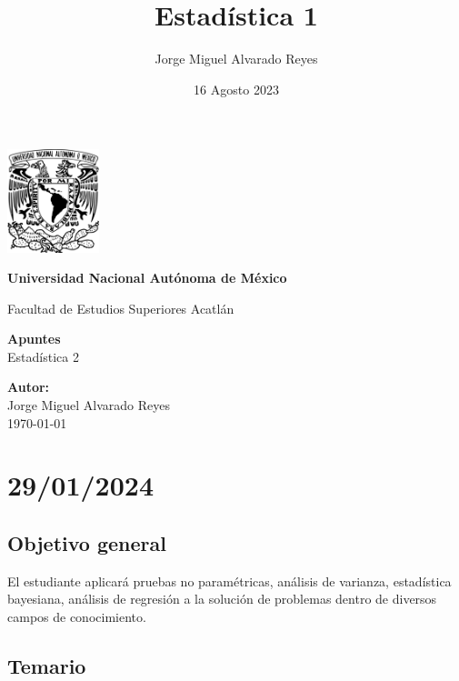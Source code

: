 \documentclass{article}
\title{Estadística 1}
\author{Jorge Miguel Alvarado Reyes}
\date{16 Agosto 2023}
\begin{document}
\begin{titlepage}
    \begin{center}
        \includegraphics[width=0.2\textwidth]{../unam.png}
        \vspace*{.5cm}

        \LARGE
        \textbf{Universidad Nacional Autónoma de México}

        \vspace{0.5cm}
        \LARGE
        Facultad de Estudios Superiores Acatlán

        \vspace{2cm}

        \textbf{Apuntes} \\
        Estadística 2

        \vfill

        \vspace{1cm}

        \textbf{\large Autor:} \\
        Jorge Miguel Alvarado Reyes \\
        \vspace{.5cm}
        \normalsize \today

    \end{center}
\end{titlepage}
\newpage

\tableofcontents

\newpage

\section{29/01/2024}

\subsection{Objetivo general}

El estudiante aplicará pruebas no paramétricas, análisis de varianza, estadística bayesiana, análisis de regresión a la solución de problemas dentro de diversos campos de conocimiento.

\subsection{Temario}
\end{document}
